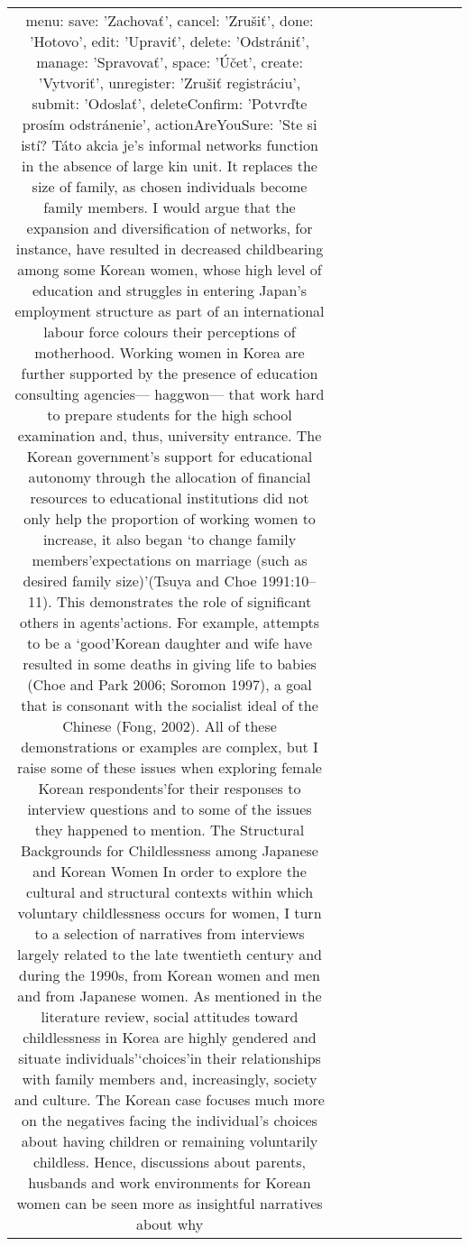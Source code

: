 \begin{table}[h!]
\begin{tabular}{|c|c|c|c|c|c|c|c|c|c|}
  menu: {
    save: 'Zachovať',
    cancel: 'Zrušiť',
    done: 'Hotovo',
    edit: 'Upraviť',
    delete: 'Odstrániť',
    manage: 'Spravovať',
    space: 'Účet',
    create: 'Vytvoriť',
    unregister: 'Zrušiť registráciu',
    submit: 'Odoslať',
    deleteConfirm: 'Potvrďte prosím odstránenie',
    actionAreYouSure: 'Ste si istí? Táto akcia je’s informal networks function in the absence of large kin unit. It replaces the size of family, as chosen individuals become family members.
I would argue that the expansion and diversification of networks, for instance, have resulted in decreased childbearing among some Korean women, whose high level of education and struggles in entering Japan’s employment structure as part of an international labour force colours their perceptions of motherhood. Working women in Korea are further supported by the presence of education consulting agencies— haggwon— that work hard to prepare students for the high school examination and, thus, university entrance. The Korean government’s support for educational autonomy through the allocation of financial resources to educational institutions did not only help the proportion of working women to increase, it also began ‘to
change family members’expectations on marriage (such as desired family size)’(Tsuya and Choe 1991:10–11).
This demonstrates the role of significant others in agents’actions. For example, attempts to be a ‘good’Korean daughter and wife have resulted in some deaths in giving life to babies (Choe and Park 2006; Soromon 1997), a goal that is consonant with the socialist ideal of the Chinese (Fong, 2002).
All of these demonstrations or examples are complex, but I raise some of these issues when exploring female Korean respondents’for their responses to interview questions and to some of the issues they happened to mention.
The Structural Backgrounds for Childlessness among Japanese and Korean Women
In order to explore the cultural and structural contexts within which voluntary childlessness occurs for women, I turn to a selection of narratives from interviews largely related to the late twentieth century and during the 1990s, from Korean women and men and from Japanese women.
As mentioned in the literature review, social attitudes toward childlessness in Korea are highly gendered and situate individuals’‘choices’in their relationships with family members and, increasingly, society and culture. The Korean case focuses much more on the negatives facing the individual’s choices about having children or remaining voluntarily childless. Hence, discussions about parents, husbands and work environments for Korean women can be seen more as insightful narratives about why
}
\end{tabular}
\end{table}
